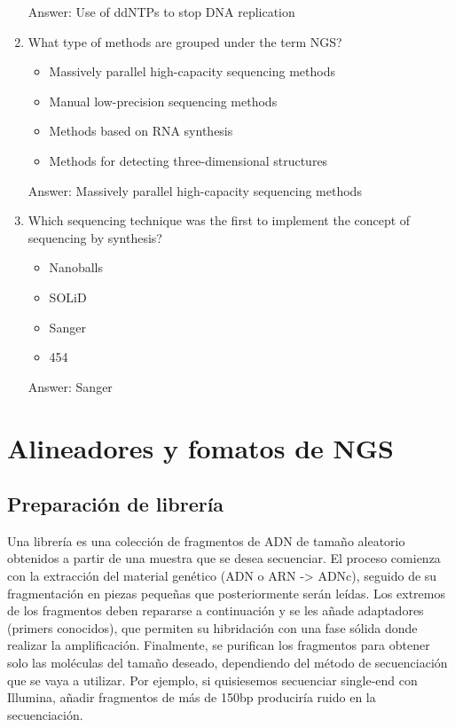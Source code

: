 \begin{enumerate}
Answer: Use of ddNTPs to stop DNA replication

\item What type of methods are grouped under the term NGS?
\begin{itemize}
\item Massively parallel high-capacity sequencing methods
\item Manual low-precision sequencing methods
\item Methods based on RNA synthesis
\item Methods for detecting three-dimensional structures
\end{itemize}

Answer: Massively parallel high-capacity sequencing methods

\item Which sequencing technique was the first to implement the concept of sequencing by synthesis?
\begin{itemize}
\item Nanoballs
\item SOLiD
\item Sanger
\item 454
\end{itemize}

Answer: Sanger
\end{enumerate}

\chapter{Alineadores y fomatos de NGS}
\section{Preparación de librería}
Una librería es una colección de fragmentos de ADN de tamaño aleatorio obtenidos a partir de una muestra que se desea secuenciar. El proceso comienza con la extracción del material genético (ADN o ARN -> ADNc), seguido de su fragmentación en piezas pequeñas que posteriormente serán leídas. Los extremos de los fragmentos deben repararse a continuación y se les añade adaptadores (primers conocidos), que permiten su hibridación con una fase sólida donde realizar la amplificación. Finalmente, se purifican los fragmentos para obtener solo las moléculas del tamaño deseado, dependiendo del método de secuenciación que se vaya a utilizar. Por ejemplo, si quisiesemos secuenciar single-end con Illumina, añadir fragmentos de más de 150bp produciría ruido en la secuenciación.


